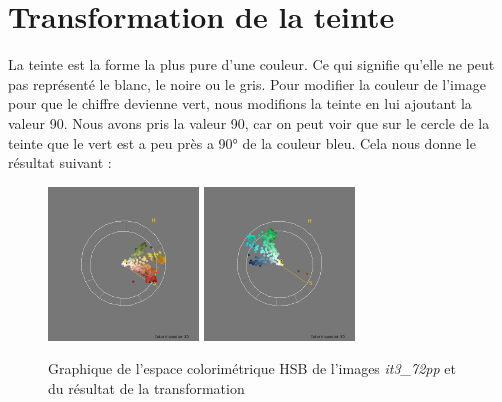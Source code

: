 \documentclass[a4paper,10pt]{article}
\begin{document}
\section{Transformation de la teinte}
La teinte est la forme la plus pure d'une couleur. Ce qui signifie qu'elle ne peut pas représenté le blanc, le noire ou le gris.
Pour modifier la couleur de l'image pour que le chiffre devienne vert, nous modifions la teinte en lui ajoutant la valeur 90.
Nous avons pris la valeur 90, car on peut voir que sur le cercle de la teinte que le vert est a peu près a 90° de la couleur bleu.
Cela nous donne le résultat suivant : 
\begin{figure}[!h]
 \begin{center}
 \includegraphics[width=4cm]{resultat/teinte1.png}
 \includegraphics[width=4cm]{resultat/teinte2.png}
 \caption{Graphique de l'espace colorimétrique HSB de l'images \textit{it3_72pp} et du résultat de la transformation}
 \end{center}
\end{figure}
\end{document}
